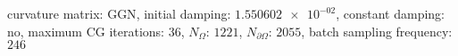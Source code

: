 curvature matrix: $\text{GGN}$, initial damping: $\num[scientific-notation=true]{1.550602e-02}$, constant damping: $\text{no}$, maximum CG iterations: $\num[scientific-notation=false]{36}$, $N_{\Omega}$: $\num[scientific-notation=false]{1221}$, $N_{\partial\Omega}$: $\num[scientific-notation=false]{2055}$, batch sampling frequency: $\num[scientific-notation=false]{246}$